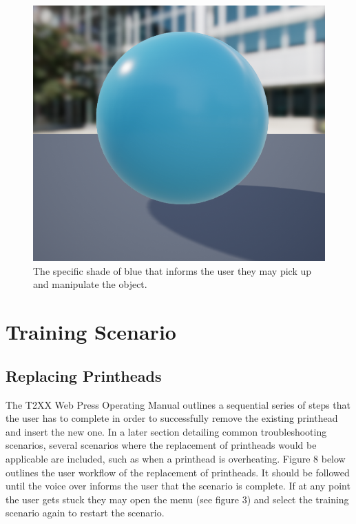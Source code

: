 \documentclass[onecolumn, draftclsnofoot,10pt, compsoc]{IEEEtran}
\begin{document}
\begin{figure}[ht!]
    \centering
    \includegraphics[scale=0.5]{touchMeBlue.png}
    \caption{The specific shade of blue that informs the user they may pick up and manipulate the object.}
    \label{fig:skyblue}
\end{figure}

\section{Training Scenario}

\subsection{Replacing Printheads}

The T2XX Web Press Operating Manual outlines a sequential series of steps that the user has to complete in order to successfully remove the existing printhead and insert the new one. In a later section detailing common troubleshooting scenarios, several scenarios where the replacement of printheads would be applicable are included, such as when a printhead is overheating. Figure 8 below outlines the user workflow of the replacement of printheads. It should be followed until the voice over informs the user that the scenario is complete. If at any point the user gets stuck they may open the menu (see figure 3) and select the training scenario again to restart the scenario.
\end{document}
